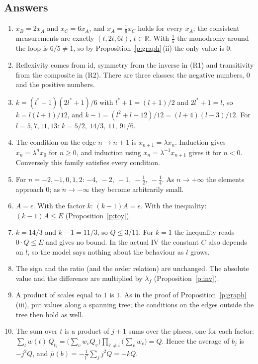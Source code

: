 \documentclass[11pt,a4paper]{article}
\newcommand{\R}{\mathbb{R}}
\newcommand{\id}{\mathrm{id}}
\theoremstyle{plain}
\theoremstyle{definition}
\theoremstyle{remark}
\begin{document}
\subsection*{Answers}
\begin{enumerate}[label=\arabic*.]
\item $x_B=2x_A$ and $x_C=6x_A$, and $x_A=\frac16x_C$ holds for every $x_A$; the consistent measurements are exactly
$(t,2t,6t)$, $t\in\R$. With $\frac15$ the monodromy around the loop is $6/5\ne1$, so by Proposition~\ref{p:graph}\,(ii)
the only value is $0$.
\item Reflexivity comes from $\id$, symmetry from the inverse in (R1) and transitivity from the composite in (R2). There
are three classes: the negative numbers, $0$ and the positive numbers.
\item $k=(l^*+1)(2l^*+1)/6$ with $l^*+1=(l+1)/2$ and $2l^*+1=l$, so $k=l(l+1)/12$, and $k-1=(l^2+l-12)/12=(l+4)(l-3)/12$.
For $l=5,7,11,13$: $k=5/2,\ 14/3,\ 11,\ 91/6$.
\item The condition on the edge $n\to n+1$ is $x_{n+1}=\lambda x_n$. Induction gives $x_n=\lambda^nx_0$ for $n\ge0$, and
induction using $x_n=\lambda^{-1}x_{n+1}$ gives it for $n<0$. Conversely this family satisfies every condition.
\item For $n=-2,-1,0,1,2$: $-4,\ -2,\ -1,\ -\frac12,\ -\frac14$. As $n\to+\infty$ the elements approach $0$; as
$n\to-\infty$ they become arbitrarily small.
\item $A=\epsilon$. With the factor $k$: $(k-1)A=\epsilon$. With the inequality: $(k-1)A\le E$
(Proposition~\ref{p:toy}).
\item $k=14/3$ and $k-1=11/3$, so $Q\le3/11$. For $k=1$ the inequality reads $0\cdot Q\le E$ and gives no bound. In the
actual IV the constant $C$ also depends on $l$, so the model says nothing about the behaviour as $l$ grows.
\item The sign and the ratio (and the order relation) are unchanged. The absolute value and the difference are multiplied
by $\lambda_f$ (Proposition~\ref{p:inv}).
\item A product of scales equal to $1$ is $1$. As in the proof of Proposition~\ref{p:graph}\,(iii), put values along a
spanning tree; the conditions on the edges outside the tree then hold as well.
\item The sum over $t$ is a product of $j+1$ sums over the places, one for each factor:
$\sum_tw(t)\,Q_{t_i}=\bigl(\sum_vw_vQ_v\bigr)\prod_{i'\ne i}\bigl(\sum_vw_v\bigr)=Q$. Hence the average of $b_j$ is
$-j^2Q$, and $\bar\mu(b)=-\frac1{l^*}\sum_jj^2Q=-kQ$.

\end{enumerate}
\end{document}
